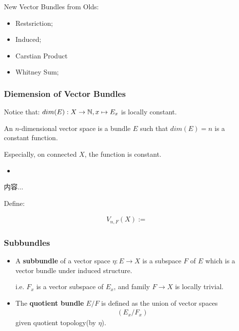 \documentclass[Total.tex]{subfiles}
\begin{document}
	New Vector Bundles from Olds:
	
	\begin{itemize}
		\item Restsriction;
		\item Induced;
		\item Carstian Product
		\item Whitney Sum;
	\end{itemize}
	
	\subsubsection{Diemension of Vector Bundles}
	
	Notice that: $dim(E):X\rightarrow \mathbb{N},x\mapsto E_x$ is locally constant. 
	
	\begin{Def}
		An $n$-dimensional vector space is a bundle $E$ such that $dim(E)=n$ is a constant function. 
		
		Especially, on connected $X$, the function is constant.
	\end{Def}
	
	\begin{itemize}
		\item 
	\end{itemize}
	
	\begin{Def}
		内容...
	\end{Def}
	
	\begin{Def}
		Define:
		
		\begin{gather*}
			V_{n,F}(X):=
		\end{gather*}
	\end{Def}
	
	\subsubsection{Subbundles}
	
	\begin{Def}
		\begin{itemize}
			\item A \textbf{subbundle} of a vector space $\eta:E\rightarrow X$ is a subspace $F$ of $E$ which is a vector bundle under induced structure.
			
			i.e. $F_x$ is a vector subspace of $E_x$, and family $F\rightarrow X$ is locally trivial. 
			
			\item The \textbf{quotient bundle} $E/F$ is defined as the union of vector spaces
			\begin{gather*}
				(E_x/F_x)
			\end{gather*}
			given quotient topology(by $\eta$). 
		\end{itemize}
	\end{Def}
	
\end{document}
